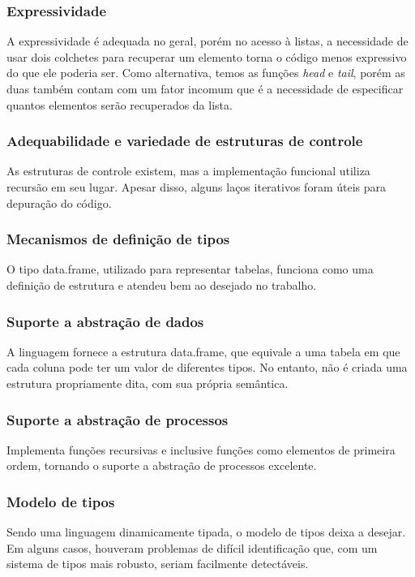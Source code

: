 \documentclass[rel_mlp]{iiufrgs}
\begin{document}
\subsubsection{Expressividade}
A expressividade é adequada no geral, porém no acesso à listas, a necessidade de usar dois colchetes para recuperar um elemento torna o código menos expressivo do que ele poderia ser. Como alternativa, temos as funções \textit{head} e \textit{tail}, porém as duas também contam com um fator incomum que é a necessidade de especificar quantos elementos serão recuperados da lista.

\subsubsection{Adequabilidade e variedade de estruturas de controle}
As estruturas de controle existem, mas a implementação funcional utiliza recursão em seu lugar. Apesar disso, alguns laços iterativos foram úteis para depuração do código.

\subsubsection{Mecanismos de definição de tipos}
O tipo data.frame, utilizado para representar tabelas, funciona como uma definição de estrutura e atendeu bem ao desejado no trabalho.

\subsubsection{Suporte a abstração de dados}
A linguagem fornece a estrutura data.frame, que equivale a uma tabela em que cada coluna pode ter um valor de diferentes tipos. No entanto, não é criada uma estrutura propriamente dita, com sua própria semântica.

\subsubsection{Suporte a abstração de processos}
Implementa funções recursivas e inclusive funções como elementos de primeira ordem, tornando o suporte a abstração de processos excelente.

\subsubsection{Modelo de tipos}
Sendo uma linguagem dinamicamente tipada, o modelo de tipos deixa a desejar. Em alguns casos, houveram problemas de difícil identificação que, com um sistema de tipos mais robusto, seriam facilmente detectáveis.
\end{document}
